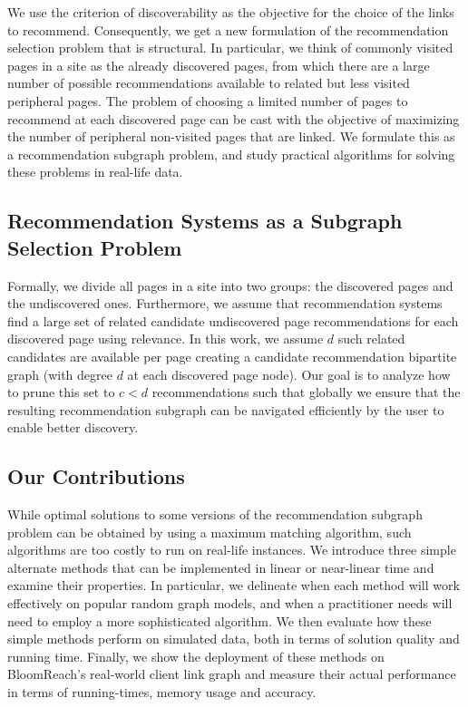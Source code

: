 We use the criterion of discoverability as the objective for the choice of the links to recommend. Consequently, we get a new formulation of the recommendation selection problem that is structural. In particular, we think of commonly visited pages in a site as the already discovered pages, from which there are a large number of possible recommendations available to related but less visited peripheral pages. The problem of choosing a limited number of pages to recommend at each discovered page can be cast with the objective of maximizing the number of peripheral non-visited pages that are linked. We formulate this as a recommendation subgraph problem, and study practical algorithms for solving these problems in real-life data. \vs

\subsection{Recommendation Systems as a Subgraph Selection Problem}

Formally, we divide all pages in a site into two groups: the discovered pages and the undiscovered ones.
Furthermore, we assume that recommendation systems~\cite{Schafer1999, Adomavicius2005,
  Resnick1997} find a large set of related candidate undiscovered page recommendations
for each discovered page using relevance. In this work, we assume $d$
such related candidates are available per page creating a candidate recommendation bipartite graph 
(with degree $d$ at each discovered page node).
Our goal is to analyze how to prune this set to $c < d$ recommendations such that
globally we ensure that the resulting recommendation subgraph can be navigated efficiently by the user to enable better discovery. \vs

\subsection{Our Contributions}
While optimal solutions to some versions of the recommendation subgraph problem can be obtained by using a maximum matching algorithm, such algorithms are too costly to run on real-life instances. We introduce three simple alternate methods that can be implemented in linear or near-linear time and examine their properties. 
In particular, we delineate when
each method will work effectively on popular random graph models, and when a practitioner needs will need to employ a more sophisticated algorithm. 
We then evaluate how these simple methods perform on simulated data, both in terms of solution quality and  running time.
Finally, we show the deployment of these methods on BloomReach's real-world client link graph and measure their
actual performance in terms of running-times, memory usage and accuracy. \vs


